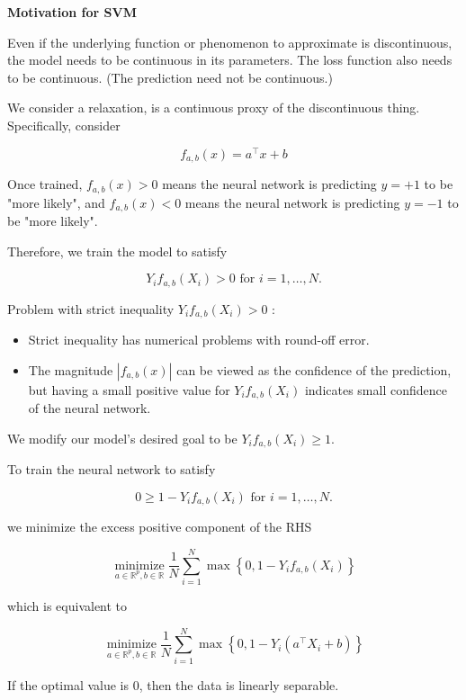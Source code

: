 \documentclass{report}
\begin{document}
\textbf{Motivation for SVM}

Even if the underlying function or phenomenon to approximate is discontinuous, the model needs to be continuous in its parameters. The loss function also needs to be continuous. (The prediction need not be continuous.)

We consider a relaxation, is a continuous proxy of the discontinuous thing. Specifically, consider

$$
f_{a, b}(x)=a^{\top} x+b
$$

Once trained, $f_{a, b}(x)>0$ means the neural network is predicting $y=+1$ to be "more likely", and $f_{a, b}(x)<0$ means the neural network is predicting $y=-1$ to be "more likely".

Therefore, we train the model to satisfy

$$
Y_{i} f_{a, b}\left(X_{i}\right)>0 \text { for } i=1, \ldots, N .
$$

Problem with strict inequality $Y_{i} f_{a, b}\left(X_{i}\right)>0$ :

\begin{itemize}
    \item Strict inequality has numerical problems with round-off error.
    \item The magnitude $\left|f_{a, b}(x)\right|$ can be viewed as the confidence of the prediction, but having a small positive value for $Y_{i} f_{a, b}\left(X_{i}\right)$ indicates small confidence of the neural network.
\end{itemize}

We modify our model's desired goal to be $Y_{i} f_{a, b}\left(X_{i}\right) \geq 1$.

To train the neural network to satisfy

$$
0 \geq 1-Y_{i} f_{a, b}\left(X_{i}\right) \text { for } i=1, \ldots, N .
$$

we minimize the excess positive component of the RHS

$$
\underset{a \in \mathbb{R}^{p}, b \in \mathbb{R}}{\operatorname{minimize}} \frac{1}{N} \sum_{i=1}^{N} \max \left\{0,1-Y_{i} f_{a, b}\left(X_{i}\right)\right\}
$$

which is equivalent to

$$
\underset{a \in \mathbb{R}^{p}, b \in \mathbb{R}}{\operatorname{minimize}} \frac{1}{N} \sum_{i=1}^{N} \max \left\{0,1-Y_{i}\left(a^{\top} X_{i}+b\right)\right\}
$$

If the optimal value is 0, then the data is linearly separable.
\end{document}
